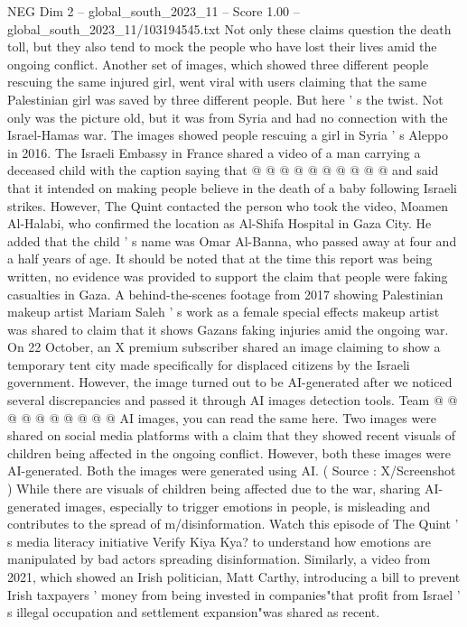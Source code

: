 \begin{textsample}{NEG Dim 2 – global\_south\_2023\_11 – Score 1.00 – global\_south\_2023\_11/103194545.txt}
Not only these claims question the death toll, but they also tend to mock the people who have lost their lives amid the ongoing conflict.
Another set of images, which showed three different people rescuing the same injured girl, went viral with users claiming that the same Palestinian girl was saved by three different people.
But here ' s the twist.
Not only was the picture old, but it was from Syria and had no connection with the Israel-Hamas war.
The images showed people rescuing a girl in Syria ' s Aleppo in 2016.
The Israeli Embassy in France shared a video of a man carrying a deceased child with the caption saying that @ @ @ @ @ @ @ @ @ @ and said that it intended on making people believe in the death of a baby following Israeli strikes.
However, The Quint contacted the person who took the video, Moamen Al-Halabi, who confirmed the location as Al-Shifa Hospital in Gaza City.
He added that the child ' s name was Omar Al-Banna, who passed away at four and a half years of age.
It should be noted that at the time this report was being written, no evidence was provided to support the claim that people were faking casualties in Gaza.
A behind-the-scenes footage from 2017 showing Palestinian makeup artist Mariam Saleh ' s work as a female special effects makeup artist was shared to claim that it shows Gazans faking injuries amid the ongoing war.
On 22 October, an X premium subscriber shared an image claiming to show a temporary tent city made specifically for displaced citizens by the Israeli government.
However, the image turned out to be AI-generated after we noticed several discrepancies and passed it through AI images detection tools.
Team @ @ @ @ @ @ @ @ @ @ AI images, you can read the same here.
Two images were shared on social media platforms with a claim that they showed recent visuals of children being affected in the ongoing conflict.
However, both these images were AI-generated.
Both the images were generated using AI. ( Source : X/Screenshot ) While there are visuals of children being affected due to the war, sharing AI-generated images, especially to trigger emotions in people, is misleading and contributes to the spread of m/disinformation.
Watch this episode of The Quint ' s media literacy initiative Verify Kiya Kya? to understand how emotions are manipulated by bad actors spreading disinformation.
Similarly, a video from 2021, which showed an Irish politician, Matt Carthy, introducing a bill to prevent Irish taxpayers ' money from being invested in companies"that profit from Israel ' s illegal occupation and settlement expansion"was shared as recent.

\end{textsample}
